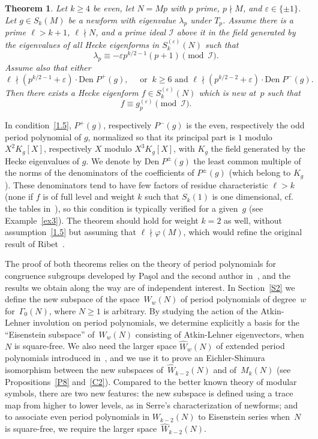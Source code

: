 \documentclass{amsart}
\theoremstyle{plain}
\newtheorem{thm}{Theorem}
\theoremstyle{definition}
\numberwithin{equation}{section}
\def\I{\mathcal{I}} \def\J{\mathcal{J}} \def\LL{\mathcal{L}}
\def\e{\varepsilon} \def\DD{\Delta} \def\G{\Gamma}\def\om{\omega}
\def\be{\begin{equation}}  \def\ee{\end{equation}}
\newcommand{\wW}{\widehat{W}}
\def\vp{\varphi}
\def\den{\mathrm{Den}\;}
\begin{document}
\begin{thm}\label{T3}Let $k\ge 4$ be even, 
let $N=Mp$ with $p$ prime, $p\nmid M$,  and $\e\in\{\pm 1\}$.
Let $g\in S_k(M)$ be a newform with eigenvalue $\lambda_p$ under $T_p$. 
Assume there is  a prime $\ell>k+1$, $\ell\nmid N$, and a prime ideal $\I$ above it
in the field generated by the eigenvalues of all Hecke eigenforms in $S_k^{(\e)}(N)$
such that 
\[ \lambda_p\equiv -\e p^{k/2-1}(p+1)\pmod \I . \]
Assume also that either 
\be\label{1.5}  \ell\nmid (p^{k/2-1}+\e) \cdot \den P^+(g),\quad
\text{ or }\  k\ge 6 \text{ and } \ell\nmid (p^{k/2-2}+\e) \cdot \den P^-(g) .
\ee 
Then there exists a Hecke eigenform
$f\in S_k^{(\e)}(N)$ which is new at~$p$ such that 
$$f\equiv g^{(\e)}_p \pmod \I.$$
\end{thm}
In condition~\eqref{1.5}, $P^+(g)$, respectively $P^-(g)$  is the even, 
respectively the odd period polynomial of $g$, 
normalized so that its principal part is $1$ modulo $X^2K_g[X]$, respectively $X$ 
modulo $X^3K_g[X]$, with $K_g$ the field generated by the Hecke eigenvalues of $g$.  
We denote by $\den P^{\pm}(g)$ the least common multiple of the norms of the 
denominators of the coefficients of $P^\pm(g)$ (which belong to $K_g$). 
These denominators tend to have few factors of residue characteristic 
$\ell> k$ (none if $f$ is of full level and weight $k$ such that $S_k(1)$ is one 
dimensional, cf. the tables in~\cite{Ma,Du}), so this condition is typically 
verified for a given~$g$ (see Example~\ref{ex3}). 
The theorem should hold for weight $k=2$ as well, without assumption~\eqref{1.5} but 
assuming that $\ell\nmid \vp(M)$,
which would refine the original result of Ribet~\cite{Ri}.

The proof of both theorems relies on the theory of period polynomials for 
congruence subgroups developed by Pa\c sol and the second author in~\cite{PP},
and the results we obtain along the way are of independent interest. 
In Section~\ref{S2} we define the new subspace of the space~$W_{w}(N)$
of period polynomials of degree~$w$  for~$\G_0(N)$, where $N\ge 1$ is arbitrary. By studying 
the action of the Atkin-Lehner involution on period polynomials,
we determine explicitly a basis for the ``Eisenstein subspace'' of~$W_{w}(N)$ 
consisting of Atkin-Lehner eigenvectors, when $N$ is square-free. 
We also need the larger space $\wW_{w}(N)$ of extended 
period polynomials introduced in~\cite{PP}, and we use it to prove an Eichler-Shimura 
isomorphism between the new subspaces of~$\wW_{k-2}(N)$ and 
of~$M_k(N)$
(see Propositions~\ref{P8} and~\ref{C2}). Compared to 
the better known theory of modular symbols, there are two new features: 
the new subspace is defined using a trace map from higher to lower levels, as in
Serre's characterization of newforms; and to associate even period polynomials
in $W_{k-2}(N)$ to Eisenstein series when~$N$ is square-free, we require 
the larger space~$\wW_{k-2}(N)$. 
\end{document}
